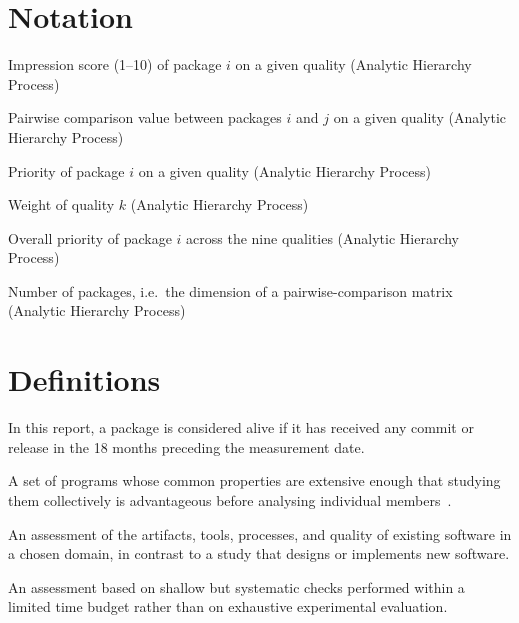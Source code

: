 
\section*{Notation}
\begin{description}[font=\rmfamily\bfseries, leftmargin=3cm, style=nextline]
	\item[$s_i$] Impression score (1--10) of package $i$ on a given quality (Analytic Hierarchy Process)
	\item[$a_{ij}$] Pairwise comparison value between packages $i$ and $j$ on a given quality (Analytic Hierarchy Process)
	\item[$w_i$] Priority of package $i$ on a given quality (Analytic Hierarchy Process)
	\item[$c_k$] Weight of quality $k$ (Analytic Hierarchy Process)
	\item[$p_i$] Overall priority of package $i$ across the nine qualities (Analytic Hierarchy Process)
	\item[$n$] Number of packages, i.e.\ the dimension of a pairwise-comparison matrix (Analytic Hierarchy Process)
\end{description}

\section*{Definitions}
\begin{description}[font=\rmfamily\bfseries, leftmargin=3cm, style=nextline]
	\item[Alive package] In this report, a package is considered alive if it has received any commit or release in the 18 months preceding the measurement date.
	\item[Software family] A set of programs whose common properties are extensive enough that studying them collectively is advantageous before analysing individual members~\citep{Parnas1976}.
	\item[State-of-the-Practice study] An assessment of the artifacts, tools, processes, and quality of existing software in a chosen domain, in contrast to a study that designs or implements new software.
	\item[Surface measure] An assessment based on shallow but systematic checks performed within a limited time budget rather than on exhaustive experimental evaluation.
\end{description}

